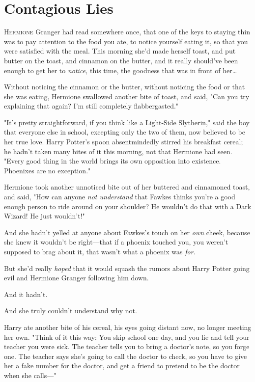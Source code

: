 \chapter{Contagious Lies}

\lettrine{H}{ermione} Granger
had read somewhere once, that one of the keys to staying thin was to pay
attention to the food you ate, to notice yourself eating it, so that you were
satisfied with the meal. This morning she'd made herself toast, and put butter
on the toast, and cinnamon on the butter, and it really should've been enough
to get her to \emph{notice,} this time, the goodness that was in front of
her{\ldots}

Without noticing the cinnamon or the butter, without noticing the food or that
she was eating, Hermione swallowed another bite of toast, and said, "Can you
try explaining that again? I'm still completely flabbergasted."

"It's pretty straightforward, if you think like a Light-Side Slytherin," said
the boy that everyone else in school, excepting only the two of them, now
believed to be her true love. Harry Potter's spoon absentmindedly stirred his
breakfast cereal; he hadn't taken many bites of it this morning, not that
Hermione had seen. "Every good thing in the world brings its own opposition
into existence. Phoenixes are no exception."

Hermione took another unnoticed bite out of her buttered and cinnamoned toast,
and said, "How can anyone \emph{not understand} that Fawkes thinks you're a
good enough person to ride around on your shoulder? He wouldn't do that with a
Dark Wizard! He just wouldn't!"

And she hadn't yelled at anyone about Fawkes's touch on her \emph{own} cheek,
because she knew it wouldn't be right---that if a phoenix touched you, you
weren't supposed to brag about it, that wasn't what a phoenix was \emph{for}.

But she'd really \emph{hoped} that it would squash the rumors about Harry
Potter going evil and Hermione Granger following him down.

And it hadn't.

And she truly couldn't understand why not.

Harry ate another bite of his cereal, his eyes going distant now, no longer
meeting her own. "Think of it this way: You skip school one day, and you lie
and tell your teacher you were sick. The teacher tells you to bring a doctor's
note, so you forge one. The teacher says she's going to call the doctor to
check, so you have to give her a fake number for the doctor, and get a friend
to pretend to be the doctor when she calls---"


